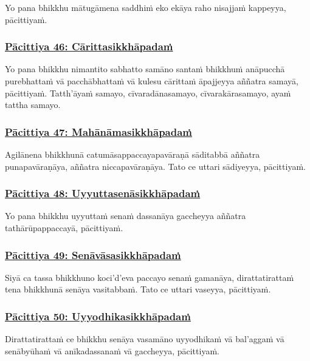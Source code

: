 Yo pana bhikkhu mātugāmena saddhiṁ eko ekāya raho nisajjaṁ kappeyya, pācittiyaṁ.

\subsubsection*{\hyperref[exp46]{Pācittiya 46: Cārittasikkhāpadaṁ}}
\label{pac46}

Yo pana bhikkhu nimantito sabhatto samāno santaṁ bhikkhuṁ anāpucchā purebhattaṁ vā pacchābhattaṁ vā kulesu cārittaṁ āpajjeyya aññatra samayā, pācittiyaṁ. Tatth'āyaṁ samayo, cīvaradānasamayo, cīvarakārasamayo, ayaṁ tattha samayo.

\subsubsection*{\hyperref[exp47]{Pācittiya 47: Mahānāmasikkhāpadaṁ}}
\label{pac47}

Agilānena bhikkhunā catumāsappaccayapavāraṇā sāditabbā aññatra punapavāraṇāya, aññatra niccapavāraṇāya. Tato ce uttari sādiyeyya, pācittiyaṁ.

\subsubsection*{\hyperref[exp48]{Pācittiya 48: Uyyuttasenāsikkhāpadaṁ}}
\label{pac48}

Yo pana bhikkhu uyyuttaṁ senaṁ dassanāya gaccheyya aññatra tathārūpappaccayā, pācittiyaṁ.

\subsubsection*{\hyperref[exp49]{Pācittiya 49: Senāvāsasikkhāpadaṁ}}
\label{pac49}

Siyā ca tassa bhikkhuno koci'd'eva paccayo senaṁ gamanāya, dirattatirattaṁ tena bhikkhunā senāya vasitabbaṁ. Tato ce uttari vaseyya, pācittiyaṁ.

\subsubsection*{\hyperref[exp50]{Pācittiya 50: Uyyodhikasikkhāpadaṁ}}
\label{pac50}

Dirattatirattaṁ ce bhikkhu senāya vasamāno uyyodhikaṁ vā bal'aggaṁ vā senābyūhaṁ vā anīkadassanaṁ vā gaccheyya, pācittiyaṁ.

